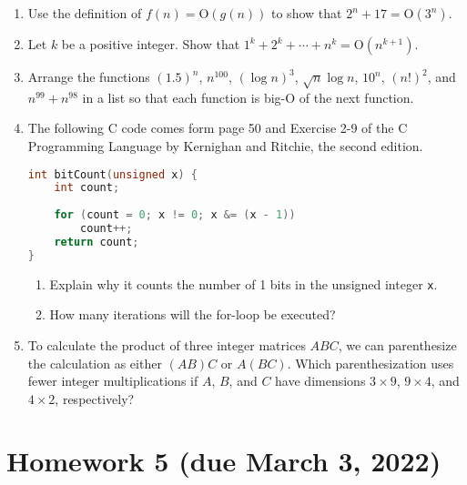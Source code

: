 \documentclass[11pt]{article}
\begin{document}
\begin{enumerate}
    \item Use the definition of $f(n) = \mathrm{O}(g(n))$ to show that $2^n + 17 = \mathrm{O}(3^n)$.
    \item Let $k$ be a positive integer. Show that $1^k + 2^k + \cdots + n^k = \mathrm{O}(n^{k+1})$.
    \item Arrange the functions $(1.5)^n$, $n^{100}$, $(\log{n})^3$, $\sqrt{n}\log{n}$, $10^n$, $(n!)^2$, and $n^{99} + n^{98}$ in a list so that each function is big-$\mathrm{O}$ of the next function.
    \item The following C code comes form page 50 and Exercise 2-9 of the C Programming Language by Kernighan and Ritchie, the second edition.
    \begin{lstlisting}[language=C]
int bitCount(unsigned x) {
    int count;
    
    for (count = 0; x != 0; x &= (x - 1))
        count++;
    return count;
}\end{lstlisting}
    \begin{enumerate}
        \item Explain why it counts the number of 1 bits in the unsigned integer \texttt{x}.
        \item How many iterations will the for-loop be executed?
    \end{enumerate}
    \item To calculate the product of three integer matrices $ABC$, we can parenthesize the calculation as either $(AB)C$ or $A(BC)$. Which parenthesization uses fewer integer multiplications if $A$, $B$, and $C$ have dimensions $3 \times 9$, $9 \times 4$, and $4 \times 2$, respectively?
\end{enumerate}

\section*{Homework 5 (due March 3, 2022)}
\end{document}
